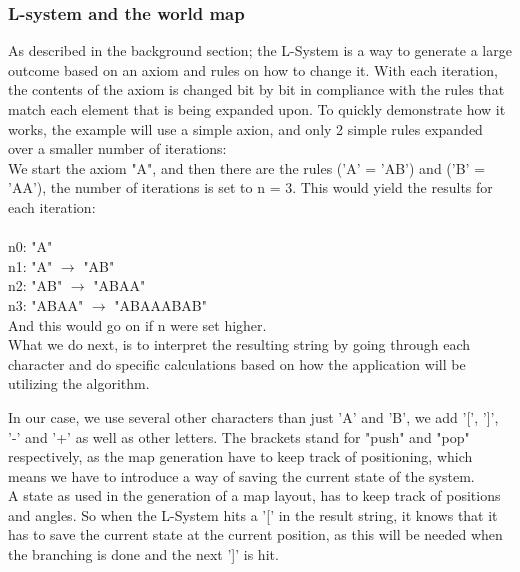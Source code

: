 \subsubsection{L-system and the world map}

As described in the background section; the L-System is a way to generate a large outcome based on an axiom and rules on how to change it. With each iteration, the contents of the axiom is changed bit by bit in compliance with the rules that match each element that is being expanded upon.
To quickly demonstrate how it works, the example will use a simple axion, and only 2 simple rules expanded over a smaller number of iterations:\\
We start the axiom "A", and then there are the rules ('A' = 'AB') and ('B' = 'AA'), the number of iterations is set to n = 3. This would yield the results for each iteration:\\\\
n0: "A"\\
n1: "A" $\rightarrow$  "AB"\\
n2: "AB"  $\rightarrow$ "ABAA"\\
n3: "ABAA"  $\rightarrow$  "ABAAABAB"\\
And this would go on if n were set higher.\\

What we do next, is to interpret the resulting string by going through each character and do specific calculations based on how the application will be utilizing the algorithm.

In our case, we use several other characters than just 'A' and 'B', we add '[', ']', '-' and '+' as well as other letters. The brackets stand for "push" and "pop" respectively, as the map generation have to keep track of positioning, which means we have to introduce a way of saving the current state of the system.\\

A state as used in the generation of a map layout, has to keep track of positions and angles. So when the L-System hits a '[' in the result string, it knows that it has to save the current state at the current position, as this will be needed when the branching is done and the next ']' is hit. 

